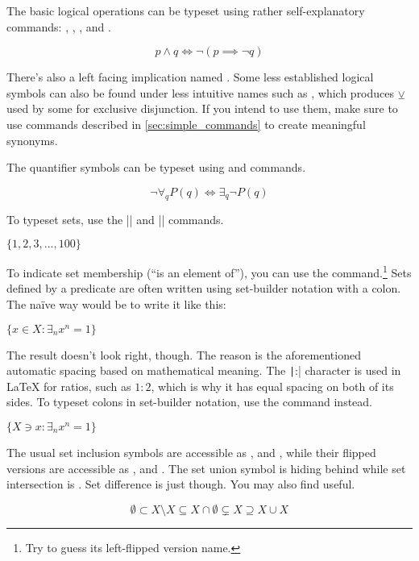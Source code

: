 The basic logical operations can be typeset using rather self-explanatory
commands: , , ,  and .
\begin{example}
\[
  p \land q \iff
  \lnot (p \implies \lnot q)
\]
\end{example}
There's also a left facing implication named . Some less
established logical symbols can also be found under less intuitive names such
as , which produces \(\veebar\) used by some for exclusive
disjunction. If you intend to use them, make sure to use commands described in
\autoref{sec:simple_commands} to create meaningful synonyms.

The quantifier symbols can be typeset using  and 
commands.
\begin{example}
\[
  \lnot\forall_{q} P(q) \iff
  \exists_{q}\lnot P(q)
\]
\end{example}

To typeset sets, use the \csiv|{| and \csiv|}| commands.
\begin{example}
\( \{1, 2, 3, \ldots, 100\} \)
\end{example}
To indicate set membership (\enquote{is an element of}), you can use the
 command.\footnote{Try to guess its left-flipped version name.} Sets
defined by a predicate are often written using set-builder notation with a
colon. The naïve way would be to write it like this:
\begin{example}
\( \{x \in X:
  \exists_n x^n = 1\} \)
\end{example}
The result doesn't look right, though. The reason is the aforementioned
automatic spacing based on mathematical meaning. The \texttt|:|
character is used in \LaTeX{} for ratios, such as \(1:2\), which is why it has
equal spacing on both of its sides. To typeset colons in set-builder notation,
use the  command instead.
\begin{example}
\(\{ X \ni x\colon
  \exists_n x^n = 1\} \)
\end{example}

The usual set inclusion symbols are accessible as , 
and , while their flipped versions are accessible as
,  and . The set union symbol is
hiding behind  while set intersection is . Set difference is
just  though. You may also find  useful.
\begin{example}
\RenewDocumentCommand{\setminus}{}{\smallsetminus}
\[
  \emptyset
  \subset X \setminus X
  \subseteq X \cap \emptyset
  \subsetneq X
  \supseteq X \cup X
\]
\end{example}

